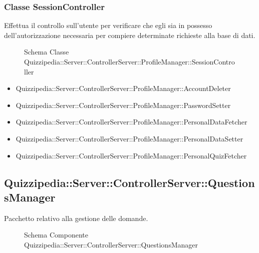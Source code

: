 \subsubsection{Classe SessionController}
Effettua il controllo sull'utente per verificare che egli sia in possesso dell'autorizzazione necessaria per compiere determinate richieste alla base di dati.
\begin{figure}[H]
\centering
\noindent{}
\caption{Schema Classe Quizzipedia::Server::ControllerServer::ProfileManager::SessionController}
\end{figure}
\begin{itemize}
\item Quizzipedia::Server::ControllerServer::ProfileManager::AccountDeleter
\item Quizzipedia::Server::ControllerServer::ProfileManager::PasswordSetter
\item Quizzipedia::Server::ControllerServer::ProfileManager::PersonalDataFetcher
\item Quizzipedia::Server::ControllerServer::ProfileManager::PersonalDataSetter
\item Quizzipedia::Server::ControllerServer::ProfileManager::PersonalQuizFetcher
\end{itemize}
\subsection{Quizzipedia::Server::ControllerServer::QuestionsManager}
Pacchetto relativo alla gestione delle domande.
\begin{figure}[H]
\centering
\noindent{}
\caption[Quizzipedia::Server::ControllerServer::QuestionsManager]{Schema Componente Quizzipedia::Server::ControllerServer::QuestionsManager}
\end{figure}
